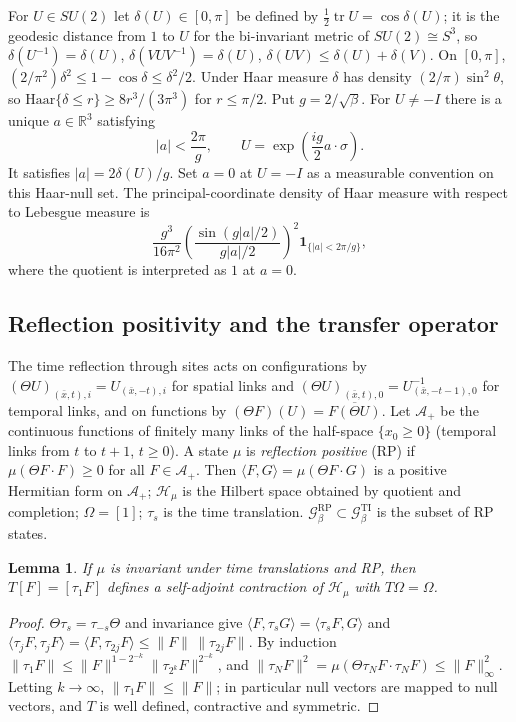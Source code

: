 \documentclass[11pt,a4paper]{article}
\theoremstyle{plain}
\newtheorem{lemma}[theorem]{Lemma}
\theoremstyle{definition}
\theoremstyle{remark}
\numberwithin{equation}{section}
\newcommand{\R}{\mathbb{R}}
\newcommand{\tr}{\operatorname{tr}}
\newcommand{\cG}{\mathcal{G}}
\newcommand{\cH}{\mathcal{H}}
\newcommand{\Th}{\Theta}
\begin{document}
For $U\in SU(2)$ let $\delta(U)\in[0,\pi]$ be defined by $\frac12\tr U=\cos\delta(U)$; it is the geodesic distance from $1$ to $U$ for the
bi-invariant metric of $SU(2)\cong S^3$, so $\delta(U^{-1})=\delta(U)$, $\delta(VUV^{-1})=\delta(U)$, $\delta(UV)\le\delta(U)+\delta(V)$.
On $[0,\pi]$, $(2/\pi^2)\delta^2\le1-\cos\delta\le\delta^2/2$. Under Haar measure $\delta$ has density $(2/\pi)\sin^2\theta$, so
$\mathrm{Haar}\{\delta\le r\}\ge8r^3/(3\pi^3)$ for $r\le\pi/2$. Put $g=2/\sqrt\beta$.
For $U\ne-I$ there is a unique $a\in\R^3$ satisfying
\[
|a|<\frac{2\pi}{g},
\qquad
U=\exp\!\left(\frac{ig}{2}a\cdot\sigma\right).
\]
It satisfies $|a|=2\delta(U)/g$. Set $a=0$ at $U=-I$ as a measurable convention on this Haar-null set.
The principal-coordinate density of Haar measure with respect to Lebesgue measure is
\[
\frac{g^3}{16\pi^2}
\left(\frac{\sin(g|a|/2)}{g|a|/2}\right)^2
\mathbf1_{\{|a|<2\pi/g\}},
\]
where the quotient is interpreted as $1$ at $a=0$.

\subsection{Reflection positivity and the transfer operator}
The time reflection through sites acts on configurations by $(\Th U)_{(\bar x,t),i}=U_{(\bar x,-t),i}$ for spatial links and
$(\Th U)_{(\bar x,t),0}=U_{(\bar x,-t-1),0}^{-1}$ for temporal links, and on functions by $(\Th F)(U)=\overline{F(\Th U)}$. Let $\mathcal A_+$
be the continuous functions of finitely many links of the half-space $\{x_0\ge0\}$ (temporal links from $t$ to $t+1$, $t\ge0$). A state
$\mu$ is \emph{reflection positive} (RP) if $\mu(\Th F\cdot F)\ge0$ for all $F\in\mathcal A_+$. Then $\langle F,G\rangle=\mu(\Th F\cdot G)$ is a
positive Hermitian form on $\mathcal A_+$; $\cH_\mu$ is the Hilbert space obtained by quotient and completion; $\Omega=[1]$; $\tau_s$ is the
time translation. $\cG^{\mathrm{RP}}_\beta\subset\cG^{\mathrm{TI}}_\beta$ is the subset of RP states.

\begin{lemma}\label{lem:OS}
If $\mu$ is invariant under time translations and RP, then $T[F]=[\tau_1F]$ defines a self-adjoint contraction of $\cH_\mu$ with $T\Omega=\Omega$.
\end{lemma}
\begin{proof}
$\Th\tau_s=\tau_{-s}\Th$ and invariance give $\langle F,\tau_sG\rangle=\langle\tau_sF,G\rangle$ and
$\langle\tau_jF,\tau_jF\rangle=\langle F,\tau_{2j}F\rangle\le\|F\|\,\|\tau_{2j}F\|$. By induction
$\|\tau_1F\|\le\|F\|^{1-2^{-k}}\|\tau_{2^k}F\|^{2^{-k}}$, and $\|\tau_NF\|^2=\mu(\Th\tau_NF\cdot\tau_NF)\le\|F\|_\infty^2$. Letting $k\to\infty$,
$\|\tau_1F\|\le\|F\|$; in particular null vectors are mapped to null vectors, and $T$ is well defined, contractive and symmetric.
\end{proof}
\end{document}
